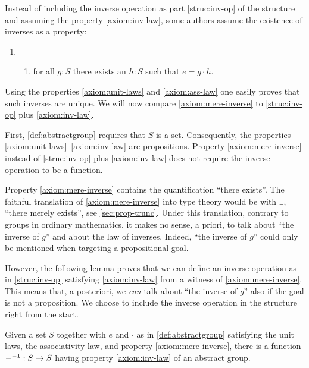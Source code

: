 \begin{remark}\label{rem:inverses-as-property}
  \makeatletter %
  \renewcommand\p@enumii{}%
  \makeatother%
  Instead of including the inverse operation as part
  \ref{struc:inv-op} of the structure and assuming the property
  \ref{axiom:inv-law}, some authors assume the existence of inverses
  as a property:
  \begin{enumerate}
  \item[]\begin{enumerate}[resume*]
    \item\label{axiom:mere-inverse} for all $g:S$ there exists an
      $h:S$ such that $e = g \cdot h$.
    \end{enumerate}
  \end{enumerate}
  Using the properties \ref{axiom:unit-laws} and
  \ref{axiom:ass-law} one easily proves that such inverses are
  unique. We will now compare \ref{axiom:mere-inverse} to \ref{struc:inv-op} plus
  \ref{axiom:inv-law}.

  First, \cref{def:abstractgroup} requires that $S$ is a set.
  Consequently, the properties
  \ref{axiom:unit-laws}--\ref{axiom:inv-law} are propositions.
  Property \ref{axiom:mere-inverse} instead of \ref{struc:inv-op} plus
  \ref{axiom:inv-law} does not require the inverse operation to be a
  function.

  Property \ref{axiom:mere-inverse} contains the quantification
  ``there exists''.  The faithful translation of
  \ref{axiom:mere-inverse} into type theory would be with $\exists$,
  ``there merely exists'', see \cref{sec:prop-trunc}.  Under this
  translation, contrary to groups in ordinary mathematics, it makes no
  sense, a priori, to talk about ``the inverse of $g$'' and about the
  law of inverses.  Indeed, ``the inverse of $g$'' could only be
  mentioned when targeting a propositional goal.

  However, the following lemma proves that we can define an inverse
  operation as in \ref{struc:inv-op} satisfying
  \ref{axiom:inv-law} from a witness of \ref{axiom:mere-inverse}.
  This means that, a posteriori, we \emph{can} talk about ``the
  inverse of $g$'' also if the goal is not a proposition.  We choose
  to include the inverse operation in the structure right from the
  start.
\end{remark} 

\begin{lemma}%
  \label{lem:group-inv-operation}%
  Given a set $S$ together with $e$ and $\cdot$ as in
  \cref{def:abstractgroup} satisfying the unit laws, the associativity
  law, and property \ref{axiom:mere-inverse}, there is a function
  ${-}^{-1}: S \to S$ having property \ref{axiom:inv-law} of an
  abstract group.
\end{lemma}

